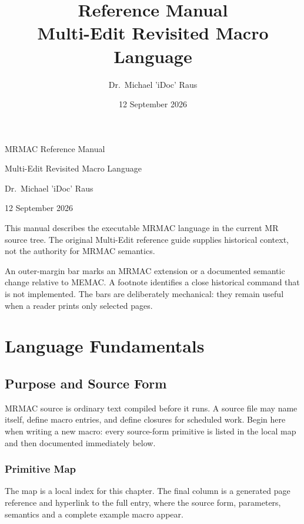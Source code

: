 \documentclass[a4paper,10pt,twoside,openany]{book}
\title{\mrmac{} Reference Manual\\\large Multi-Edit Revisited Macro Language}
\author{Dr.\ Michael 'iDoc' Raus}
\date{12 September 2026}
\newcommand{\mrmac}{\textsc{MRMAC}}
\begin{document}
\begin{titlepage}
\begin{center}
\vspace*{\fill}
{\LARGE \mrmac{} Reference Manual\par}
\vspace{0.25\baselineskip}
{\large Multi-Edit Revisited Macro Language\par}
\vspace{3\baselineskip}
{\large Dr.\ Michael 'iDoc' Raus\par}
\vspace{2\baselineskip}
{\large 12 September 2026\par}
\end{center}

\vfill
\begin{minipage}{0.82\textwidth}
\small
This manual describes the executable MRMAC language in the current MR source
tree. The original Multi-Edit reference guide supplies historical context, not
the authority for MRMAC semantics.

\begin{changebar}
An outer-margin bar marks an MRMAC extension or a documented semantic change
relative to MEMAC. A footnote identifies a close historical command that is not
implemented. The bars are deliberately mechanical: they remain useful when a
reader prints only selected pages.
\end{changebar}
\end{minipage}
\vspace*{1.5cm}
\end{titlepage}

\tableofcontents
\clearpage



\part{Language Fundamentals}

\chapter{Purpose and Source Form}

MRMAC source is ordinary text compiled before it runs. A source file may name itself, define macro entries, and define closures for scheduled work. Begin here when writing a new macro: every source-form primitive is listed in the local map and then documented immediately below.

\section{Primitive Map}
The map is a local index for this chapter. The final column is a generated page
reference and hyperlink to the full entry, where the source form, parameters,
semantics and a complete example macro appear.
\end{document}
